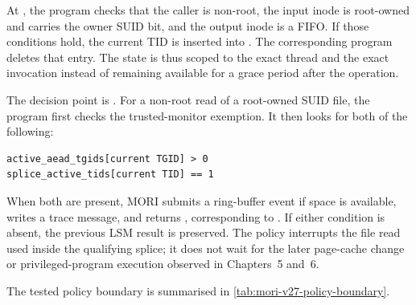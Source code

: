 At , the program checks that the caller is non-root,
the input inode is root-owned and carries the owner SUID bit, and the output
inode is a FIFO. If those conditions hold, the current TID is inserted into
. The corresponding 
program deletes that entry. The state is thus scoped to the exact thread and
the exact invocation instead of remaining available for a grace period after
the operation.

The decision point is . For a non-root read of a
root-owned SUID file, the program first checks the trusted-monitor exemption.
It then looks for both of the following:

\begin{lstlisting}
active_aead_tgids[current TGID] > 0
splice_active_tids[current TID] == 1
\end{lstlisting}

When both are present, MORI submits a ring-buffer event if space is available,
writes a trace message, and returns , corresponding to
. If either condition is absent, the previous LSM result is
preserved. The policy interrupts the file read used inside the qualifying
splice; it does not wait for the later page-cache change or privileged-program
execution observed in Chapters~5 and~6.

The tested policy boundary is summarised in
\cref{tab:mori-v27-policy-boundary}.

